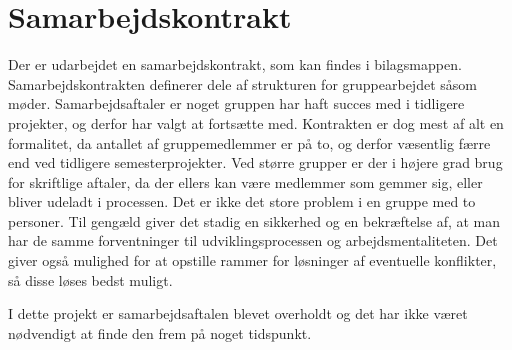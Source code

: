 \chapter{Samarbejdskontrakt}
Der er udarbejdet en samarbejdskontrakt, som kan findes i bilagsmappen. Samarbejdskontrakten definerer dele af strukturen for gruppearbejdet såsom møder. Samarbejdsaftaler er noget gruppen har haft succes med i tidligere projekter, og derfor har valgt at fortsætte med. Kontrakten er dog mest af alt en formalitet, da antallet af gruppemedlemmer er på to, og derfor væsentlig færre end ved tidligere semesterprojekter. Ved større grupper er der i højere grad brug for skriftlige aftaler, da der ellers kan være medlemmer som gemmer sig, eller bliver udeladt i processen. Det er ikke det store problem i en gruppe med to personer. Til gengæld giver det stadig en sikkerhed og en bekræftelse af, at man har de samme forventninger til udviklingsprocessen og arbejdsmentaliteten. Det giver også mulighed for at opstille rammer for løsninger af eventuelle konflikter, så disse løses bedst muligt.

I dette projekt er samarbejdsaftalen blevet overholdt og det har ikke været nødvendigt at finde den frem på noget tidspunkt.  